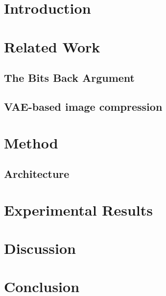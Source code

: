 \documentclass{article}
\begin{document}
\section{Introduction}
\section{Related Work}
\subsection{The Bits Back Argument}
\subsection{VAE-based image compression}
\section{Method}

\subsection{Architecture}
\paragraph{}

\section{Experimental Results}
\section{Discussion}
\section{Conclusion}

\printbibliography
\end{document}
